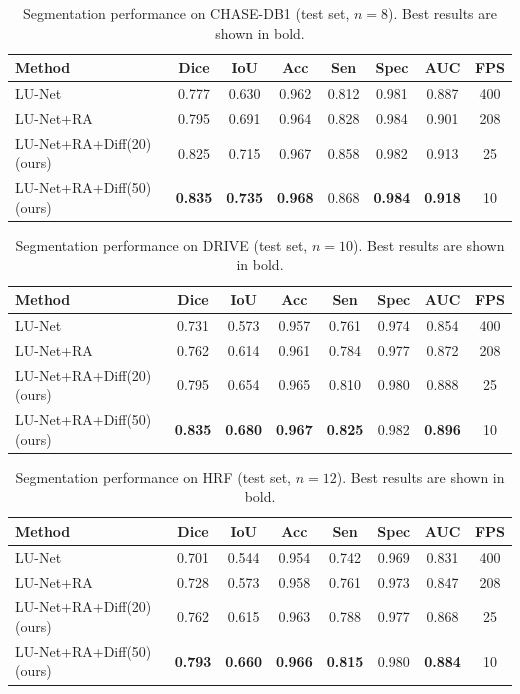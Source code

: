 \documentclass[journal,article,submit,pdftex,moreauthors]{Definitions/mdpi}
\begin{document}
\begin{table}[H]
\centering
\caption{Segmentation performance on CHASE-DB1 (test set, $n=8$). Best results are shown in bold.}
\label{tab:chase_results}
\begin{tabular}{lccccccc}
\toprule
Method & Dice & IoU & Acc & Sen & Spec & AUC & FPS \\
\midrule
LU-Net~\cite{Hernandez2025} & 0.777 & 0.630 & 0.962 & 0.812 & 0.981 & 0.887 & 400 \\
LU-Net+RA~\cite{Hernandez2025} & 0.795 & 0.691 & 0.964 & 0.828 & 0.984 & 0.901 & 208 \\
LU-Net+RA+Diff(20) (ours) & 0.825 & 0.715 & 0.967 & 0.858 & 0.982 & 0.913 & 25 \\
LU-Net+RA+Diff(50) (ours) & \textbf{0.835} & \textbf{0.735} & \textbf{0.968} & 0.868 & \textbf{0.984} & \textbf{0.918} & 10 \\
\bottomrule
\end{tabular}
\end{table}
\begin{table}[H]
\centering
\caption{Segmentation performance on DRIVE (test set, $n=10$). Best results are shown in bold.}
\begin{tabular}{lccccccc}
\toprule
Method & Dice & IoU & Acc & Sen & Spec & AUC & FPS \\
\midrule
LU-Net~\cite{Hernandez2025} & 0.731 & 0.573 & 0.957 & 0.761 & 0.974 & 0.854 & 400 \\
LU-Net+RA~\cite{Hernandez2025} & 0.762 & 0.614 & 0.961 & 0.784 & 0.977 & 0.872 & 208 \\
LU-Net+RA+Diff(20) (ours) & 0.795 & 0.654 & 0.965 & 0.810 & 0.980 & 0.888 & 25 \\
LU-Net+RA+Diff(50) (ours) & \textbf{0.835} & \textbf{0.680} & \textbf{0.967} & \textbf{0.825} & 0.982 & \textbf{0.896} & 10 \\
\bottomrule
\end{tabular}
\label{tab:drive_results}
\end{table}

\begin{table}[H]
\centering
\caption{Segmentation performance on HRF (test set, $n=12$). Best results are shown in bold.}
\begin{tabular}{lccccccc}
\toprule
Method & Dice & IoU & Acc & Sen & Spec & AUC & FPS \\
\midrule
LU-Net~\cite{Hernandez2025} & 0.701 & 0.544 & 0.954 & 0.742 & 0.969 & 0.831 & 400 \\
LU-Net+RA~\cite{Hernandez2025} & 0.728 & 0.573 & 0.958 & 0.761 & 0.973 & 0.847 & 208 \\
LU-Net+RA+Diff(20) (ours) & 0.762 & 0.615 & 0.963 & 0.788 & 0.977 & 0.868 & 25 \\
LU-Net+RA+Diff(50) (ours) & \textbf{0.793} & \textbf{0.660} & \textbf{0.966} & \textbf{0.815} & 0.980 & \textbf{0.884} & 10 \\
\bottomrule
\end{tabular}
\label{tab:hrf_results}
\end{table}
\end{document}

